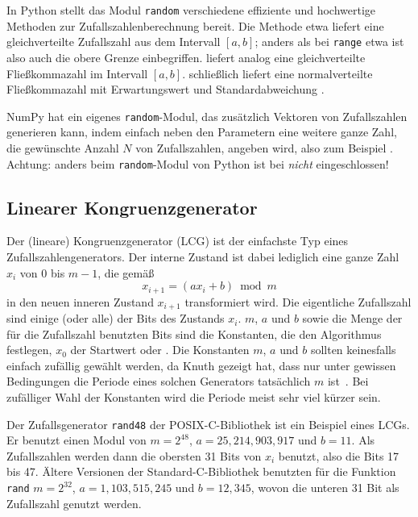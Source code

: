 In Python stellt das Modul \texttt{random} verschiedene effiziente und
hochwertige Methoden zur Zufallszahlenberechnung bereit. Die Methode
 etwa liefert eine gleichverteilte
Zufallszahl aus dem Intervall $[a,b]$; anders als bei \lstinline!range!
etwa ist also auch die obere Grenze
einbegriffen.  liefert analog eine
gleichverteilte Fließkommazahl im Intervall
$[a,b]$.  schließlich liefert eine
normalverteilte Fließkommazahl mit Erwartungswert  und
Standardabweichung .

NumPy hat ein eigenes \texttt{random}-Modul, das zusätzlich Vektoren
von Zufallszahlen generieren kann, indem einfach neben den Parametern
eine weitere ganze Zahl, die gewünschte Anzahl $N$ von Zufallszahlen,
angeben wird, also zum Beispiel . Achtung: anders beim \texttt{random}-Modul von Python ist bei
  \emph{nicht}
eingeschlossen!

\subsection{Linearer Kongruenzgenerator}

Der (lineare) Kongruenzgenerator (LCG) ist der einfachste Typ eines
Zufallszahlengenerators. Der interne Zustand ist dabei lediglich eine
ganze Zahl $x_i$ von $0$ bis $m-1$, die gemäß
\begin{equation}
  x_{i+1} = (a x_i + b) \bmod m
\end{equation}
in den neuen inneren Zustand $x_{i+1}$ transformiert wird.  Die
eigentliche Zufallszahl sind einige (oder alle) der Bits des Zustands
$x_i$.  $m$, $a$ und $b$ sowie die Menge der für die Zufallszahl
benutzten Bits sind die Konstanten, die den Algorithmus festlegen,
$x_0$ der Startwert oder \emph{}.  Die Konstanten $m$,
$a$ und $b$ sollten keinesfalls einfach zufällig gewählt werden, da
Knuth gezeigt hat, dass nur unter gewissen Bedingungen die Periode
eines solchen Generators tatsächlich $m$ ist~\cite{knuth81b}.  Bei
zufälliger Wahl der Konstanten wird die Periode meist sehr viel kürzer
sein.

Der Zufallsgenerator \texttt{rand48} der POSIX-C-Bibliothek ist ein
Beispiel eines LCGs.  Er benutzt einen Modul von $m=2^{48}$,
$a=25,214,903,917$ und $b=11$.  Als Zufallszahlen werden dann die
obersten 31 Bits von $x_i$ benutzt, also die Bits 17 bis 47.  Ältere
Versionen der Standard-C-Bibliothek benutzten für die Funktion
\texttt{rand} $m=2^{32}$, $a=1,103,515,245$ und $b=12,345$, wovon die
unteren 31 Bit als Zufallszahl genutzt werden.

